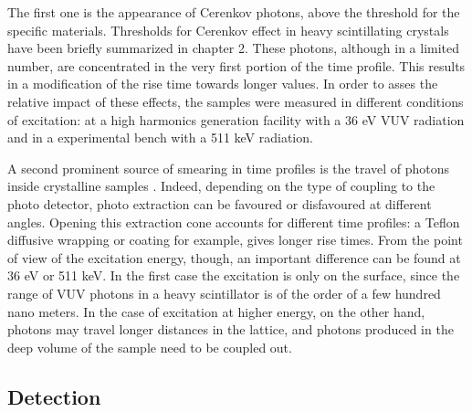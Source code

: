 The first one is the appearance of Cerenkov photons, above the threshold for the specific materials. Thresholds for Cerenkov effect in heavy scintillating crystals have been briefly summarized in chapter 2.
These photons, although in a limited number, are concentrated in the very first portion of the time profile. This results in a modification of the rise time towards longer values.
In order to asses the relative impact of these effects, the samples were measured in different conditions of excitation: at a high harmonics generation facility with a 36 eV VUV radiation and in a experimental bench with a 511 keV radiation.

A second prominent source of smearing in time profiles is the travel of photons inside crystalline samples \cite{Derenzo2000}. Indeed, depending on the type of coupling to the photo detector, photo extraction can be favoured or disfavoured at different angles. Opening this extraction cone accounts for different time profiles: a Teflon diffusive wrapping or coating for example, gives longer rise times. From the point of view of the excitation energy, though, an important difference can be found at 36 eV or 511 keV. In the first case the excitation is only on the surface, since the range of VUV photons in a heavy scintillator is of the order of a few hundred nano meters.
In the case of excitation at higher energy, on the other hand, photons may travel longer distances in the lattice, and photons produced in the deep volume of the sample need to be coupled out.

\subsection{Detection}

